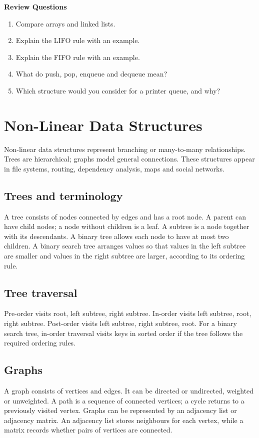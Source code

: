 \documentclass[11pt,openany,oneside]{book}
\newcommand{\reviewtitle}{\par\noindent\textbf{\color{Navy}Review Questions}\par}
\begin{document}
\reviewtitle
\begin{enumerate}
\item Compare arrays and linked lists.
\item Explain the LIFO rule with an example.
\item Explain the FIFO rule with an example.
\item What do push, pop, enqueue and dequeue mean?
\item Which structure would you consider for a printer queue, and why?
\end{enumerate}

\chapter{Non-Linear Data Structures}
Non-linear data structures represent branching or many-to-many relationships. Trees are hierarchical; graphs model general connections. These structures appear in file systems, routing, dependency analysis, maps and social networks.

\section{Trees and terminology}
A tree consists of nodes connected by edges and has a root node. A parent can have child nodes; a node without children is a leaf. A subtree is a node together with its descendants. A binary tree allows each node to have at most two children. A binary search tree arranges values so that values in the left subtree are smaller and values in the right subtree are larger, according to its ordering rule.

\section{Tree traversal}
Pre-order visits root, left subtree, right subtree. In-order visits left subtree, root, right subtree. Post-order visits left subtree, right subtree, root. For a binary search tree, in-order traversal visits keys in sorted order if the tree follows the required ordering rules.

\section{Graphs}
A graph consists of vertices and edges. It can be directed or undirected, weighted or unweighted. A path is a sequence of connected vertices; a cycle returns to a previously visited vertex. Graphs can be represented by an adjacency list or adjacency matrix. An adjacency list stores neighbours for each vertex, while a matrix records whether pairs of vertices are connected.
\end{document}
